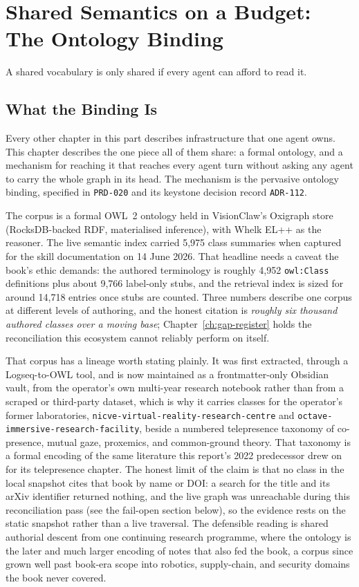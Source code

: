 \chapter{Shared Semantics on a Budget: The Ontology Binding}
\label{ch:ontology-binding}

\epigraph{A shared vocabulary is only shared if every agent can afford to read it.}{}

\section{What the Binding Is}

Every other chapter in this part describes infrastructure that one agent owns. This
chapter describes the one piece all of them share: a formal ontology, and a mechanism for
reaching it that reaches every agent turn without asking any agent to carry the whole
graph in its head. The mechanism is the pervasive ontology binding, specified in
\texttt{PRD-020} and its keystone decision record \texttt{ADR-112}.

The corpus is a formal OWL~2 ontology held in VisionClaw's Oxigraph store (RocksDB-backed
RDF, materialised inference), with Whelk EL++ as the reasoner. The live semantic index
carried 5,975 class summaries when captured for the skill documentation on 14 June 2026.
That headline needs a caveat the book's ethic demands: the authored terminology is roughly
4,952 \texttt{owl:Class} definitions plus about 9,766 label-only stubs, and the retrieval
index is sized for around 14,718 entries once stubs are counted. Three numbers describe one
corpus at different levels of authoring, and the honest citation is \emph{roughly six
thousand authored classes over a moving base}; Chapter~\ref{ch:gap-register} holds the
reconciliation this ecosystem cannot reliably perform on itself.

That corpus has a lineage worth stating plainly. It was first extracted, through a
Logseq-to-OWL tool, and is now maintained as a frontmatter-only Obsidian vault, from the
operator's own multi-year research notebook rather than
from a scraped or third-party dataset, which is why it carries classes for the operator's
former laboratories, \texttt{nicve-virtual-reality-research-centre} and
\texttt{octave-immersive-research-facility}, beside a numbered telepresence taxonomy of
co-presence, mutual gaze, proxemics, and common-ground theory. That taxonomy is a formal
encoding of the same literature this report's 2022 predecessor \parencite{OHare2022Convergence}
drew on for its telepresence chapter. The honest limit of the claim is that no class in the
local snapshot cites that book by name or DOI: a search for the title and its arXiv
identifier returned nothing, and the live graph was unreachable during this reconciliation
pass (see the fail-open section below), so the evidence rests on the static snapshot rather
than a live traversal. The defensible reading is shared authorial descent from one
continuing research programme, where the ontology is the later and much larger encoding of
notes that also fed the book, a corpus since grown well past book-era scope into robotics,
supply-chain, and security domains the book never covered.

